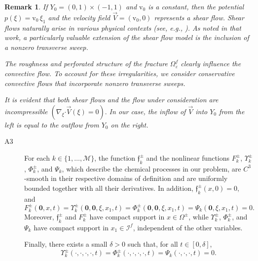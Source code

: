 \documentclass[reqno]{amsart}            %
\newtheorem{remark}{Remark}[section]
\numberwithin{equation}{section}
\begin{document}
	\begin{remark}
		If $Y_0 = (0, 1)\times (-1, 1)$ and $\mathrm{v}_0$ is a constant,  then the potential $p(\xi) = \mathrm{v}_0 \, \xi_1$ and the velocity field $\overrightarrow{V} = (\mathrm{v}_0, 0)$ represents a shear flow.
		Shear flows naturally arise in various physical contexts (see, e.g., \cite{Maj_Kra_1999}). As noted in that work, a particularly valuable extension of the shear flow model is the inclusion of a nonzero transverse sweep.
		
		The roughness and perforated structure of the fracture $\Omega^f_\varepsilon$ clearly influence the convective flow. To account for these irregularities, we consider conservative convective flows that incorporate nonzero transverse sweeps.
		
		It is evident that both shear flows and the flow under consideration are incompressible $(\nabla_\xi \boldsymbol{\cdot} \overrightarrow{V}(\xi) = 0).$
		In our case, the inflow of $\overrightarrow{V}$ into $Y_0$ from the left is equal to the outflow from $Y_0$ on the right.
		
	\end{remark}
	
	\begin{description}
		\item[A3] For each $k\in \{1,\ldots,\mathcal{M}\}$, the function $\mathfrak{f}_k^\pm$ and the nonlinear functions 
		$F^\pm_k$, $\Upsilon^\pm_k$, $\Phi^\pm_k$, and $\Psi_k$, which describe the chemical processes in our problem, 
		are $C^3$-smooth in their respective domains of definition and are uniformly bounded together with all their derivatives. 
		In addition, 
		$
		\mathfrak{f}_k^\pm(x,0)=0,
		$
		and
		\begin{equation}\label{init-conds}
			F_k^\pm(\mathbf{0},x,t)
			= \Upsilon_k^\pm(\mathbf{0},\mathbf{0},\xi,x_1,t)
			= \Phi_k^\pm(\mathbf{0},\mathbf{0},\xi,x_1,t)
			= \Psi_k(\mathbf{0},\xi,x_1,t)
			= 0.
		\end{equation}
		Moreover, $\mathfrak{f}_k^\pm$ and $F^\pm_k$ have compact support in $x\in\Omega^\pm$, while 
		$\Upsilon^\pm_k$, $\Phi^\pm_k$, and $\Psi_k$ have compact support in $x_1\in \mathcal{I}^f$, independent of the other variables.
		
		Finally, there exists a small $\delta>0$ such that, for all $t\in[0,\delta]$,
		\begin{equation}\label{init-conds+}
			\Upsilon_k^\pm(\cdot,\cdot,\cdot,\cdot,t)
			= \Phi_k^\pm(\cdot,\cdot,\cdot,\cdot,t)
			= \Psi_k(\cdot,\cdot,\cdot,t)
			= 0.
		\end{equation}
	\end{description}
	
\end{document}
